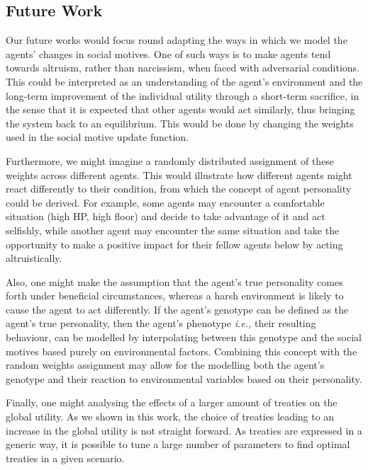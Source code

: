 \subsection{Future Work}
Our future works would focus round adapting the ways in which we model the agents' changes in social motives. One of such ways is to make agents tend towards altruism, rather than narcissism, when faced with adversarial conditions. This could be interpreted as an understanding of the agent's environment and the long-term improvement of the individual utility through a short-term sacrifice, in the sense that it is expected that other agents would act similarly, thus bringing the system back to an equilibrium. This would be done by changing the weights used in the social motive update function.

Furthermore, we might imagine a randomly distributed assignment of these weights across different agents. This would illustrate how different agents might react differently to their condition, from which the concept of agent personality could be derived. For example, some agents may encounter a comfortable situation (high HP, high floor) and decide to take advantage of it and act selfishly, while another agent may encounter the same situation and take the opportunity to make a positive impact for their fellow agents below by acting altruistically.

Also, one might make the assumption that the agent's true personality comes forth under beneficial circumstances, whereas a harsh environment is likely to cause the agent to act differently. If the agent's genotype can be defined as the agent's true personality, then the agent's phenotype \emph{i.e.,} their resulting behaviour, can be modelled by interpolating between this genotype and the social motives based purely on environmental factors. Combining this concept with the random weights assignment may allow for the modelling both the agent's genotype and their reaction to environmental variables based on their personality.

Finally, one might analysing the effects of a larger amount of treaties on the global utility. As we shown in this work, the choice of treaties leading to an increase in the global utility is not straight forward. As treaties are expressed in a generic way, it is possible to tune a large number of parameters to find optimal treaties in a given scenario.



